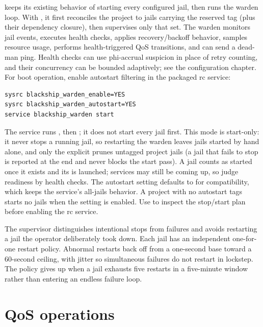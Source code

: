  keeps its existing behavior of starting every
configured jail, then runs the warden loop. With , it
first reconciles the project to jails carrying the reserved
 tag (plus their dependency closure), then supervises only
that set. The warden monitors jail events,
executes health checks, applies recovery/backoff behavior, samples resource
usage, performs health-triggered QoS transitions, and can send a dead-man ping.
Health checks can use phi-accrual suspicion in place of retry counting, and
their concurrency can be bounded adaptively; see the configuration chapter.
For boot operation, enable autostart filtering in the packaged rc service:

\begin{lstlisting}[language=bash]
sysrc blackship_warden_enable=YES
sysrc blackship_warden_autostart=YES
service blackship_warden start
\end{lstlisting}

The service runs , then ; it does
not start every jail first. This mode is start-only: it never stops a running
jail, so restarting the warden leaves jails started by hand alone, and only the
explicit  prunes untagged project jails (a jail that
fails to stop is reported at the end and never blocks the start pass). A jail
counts as started once it exists and its  is launched; services
may still be coming up, so judge readiness by health checks. The autostart setting defaults to  for
compatibility, which keeps the service's all-jails behavior. A project with no
autostart tags starts no jails when the setting is enabled. Use
 to inspect the stop/start plan before
enabling the rc service.

The supervisor distinguishes intentional stops from failures and avoids
restarting a jail the operator deliberately took down. Each jail has an
independent one-for-one restart policy. Abnormal restarts back off from a
one-second base toward a 60-second ceiling, with jitter so simultaneous
failures do not restart in lockstep. The policy gives up when a jail exhausts
five restarts in a five-minute window rather than entering an endless failure
loop.

\section{QoS operations}

